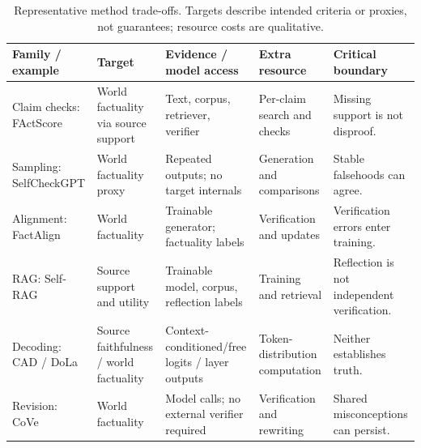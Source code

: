 \begin{table}[t]
\centering
\fontsize{9}{10.2}\selectfont
\setlength{\tabcolsep}{3pt}
\renewcommand{\arraystretch}{1.0}
\begin{tabularx}{\textwidth}{@{}>{\raggedright\arraybackslash}p{}>{\raggedright\arraybackslash}p{}>{\raggedright\arraybackslash}p{}>{\raggedright\arraybackslash}p{}>{\raggedright\arraybackslash}X@{}}
\toprule
Family / example & Target & Evidence / model access & Extra resource & Critical boundary \\
\midrule
Claim checks: FActScore \citep{min-etal-2023-factscore} & World factuality via source support & Text, corpus, retriever, verifier & Per-claim search and checks & Missing support is not disproof. \\
Sampling: SelfCheckGPT \citep{manakul-etal-2023-selfcheckgpt} & World factuality proxy & Repeated outputs; no target internals & Generation and comparisons & Stable falsehoods can agree. \\
Alignment: FactAlign \citep{huang-chen-2024-factalign} & World factuality & Trainable generator; factuality labels & Verification and updates & Verification errors enter training. \\
RAG: Self-RAG \citep{extselfrag2024} & Source support and utility & Trainable model, corpus, reflection labels & Training and retrieval & Reflection is not independent verification. \\
Decoding: CAD / DoLa \citep{shi-etal-2024-trusting,extdola2024} & Source faithfulness / world factuality & Context-conditioned/free logits / layer outputs & Token-distribution computation & Neither establishes truth. \\
Revision: CoVe \citep{dhuliawala-etal-2024-chain} & World factuality & Model calls; no external verifier required & Verification and rewriting & Shared misconceptions can persist. \\
\bottomrule
\end{tabularx}
\caption{Representative method trade-offs. Targets describe intended criteria or proxies, not guarantees; resource costs are qualitative.}
\label{tab:method-comparison}
\end{table}
